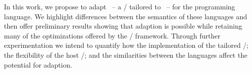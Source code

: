 

%
%
%

% 
%


In this work, we propose to adapt \SOMns ~-- a \Newspeak \VM/ tailored to \Newspeak ~-- for the \Grace programming language. We highlight differences between the semantics of these languages and then offer preliminary results showing that adaption is possible while retaining many of the optimizations offered by the \VM/ framework. Through further experimentation we intend to quantify how the implementation of the tailored \VM/; the flexibility of the host \VM/; and the similarities between the languages affect the potential for adaption.

